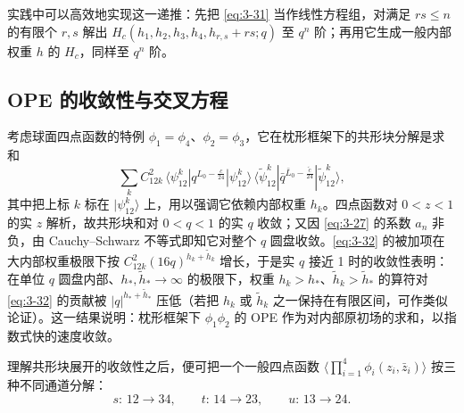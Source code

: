 
实践中可以高效地实现这一递推：先把 \eqref{eq:3-31} 当作线性方程组，对满足 $rs\le n$ 的有限个 $r,s$ 解出 $H_c(h_1,h_2,h_3,h_4,h_{r,s}+rs;q)$ 至 $q^n$ 阶；再用它生成一般内部权重 $h$ 的 $H_c$，同样至 $q^n$ 阶。

\subsection{OPE 的收敛性与交叉方程}

考虑球面四点函数的特例 $\phi_1=\phi_4$、$\phi_2=\phi_3$，它在枕形框架下的共形块分解是求和
\begin{equation}\label{eq:3-32}
  \sum_k C_{12k}^2\,
  \langle\psi^k_{12}|q^{L_0-\frac{c}{24}}|\psi^k_{12}\rangle\,
  \langle\tilde\psi^k_{12}|\bar q^{\bar L_0-\frac{\tilde c}{24}}|\tilde\psi^k_{12}\rangle,
\end{equation}
其中把上标 $k$ 标在 $|\psi^k_{12}\rangle$ 上，用以强调它依赖内部权重 $h_k$。四点函数对 $0<z<1$ 的实 $z$ 解析，故共形块和对 $0<q<1$ 的实 $q$ 收敛；又因 \eqref{eq:3-27} 的系数 $a_n$ 非负，由 Cauchy--Schwarz 不等式即知它对整个 $q$ 圆盘收敛。\eqref{eq:3-32} 的被加项在大内部权重极限下按 $C_{12k}^2(16q)^{h_k+\tilde h_k}$ 增长，于是实 $q$ 接近 1 时的收敛性表明：在单位 $q$ 圆盘内部、$h_*,\tilde h_*\to\infty$ 的极限下，权重 $h_k>h_*$、$\tilde h_k>\tilde h_*$ 的算符对 \eqref{eq:3-32} 的贡献被 $|q|^{h_*+\tilde h_*}$ 压低（若把 $h_k$ 或 $\tilde h_k$ 之一保持在有限区间，可作类似论证）。这一结果说明：枕形框架下 $\phi_1\phi_2$ 的 OPE 作为对内部原初场的求和，以指数式快的速度收敛。


理解共形块展开的收敛性之后，便可把一个一般四点函数 $\langle\prod_{i=1}^4\phi_i(z_i,\bar z_i)\rangle$ 按三种不同通道分解：
\begin{equation}\label{eq:3-33}
  s:\,12\to34,\qquad t:\,14\to23,\qquad u:\,13\to24 .
\end{equation}

